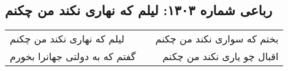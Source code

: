 \begin{center}
\section*{رباعی شماره ۱۳۰۳: لیلم که نهاری نکند من چکنم}
\label{sec:1303}
\begin{longtable}{l p{0.5cm} r}
لیلم که نهاری نکند من چکنم
&&
بختم که سواری نکند من چکنم
\\
گفتم که به دولتی جهانرا بخورم
&&
اقبال چو یاری نکند من چکنم
\\
\end{longtable}
\end{center}

